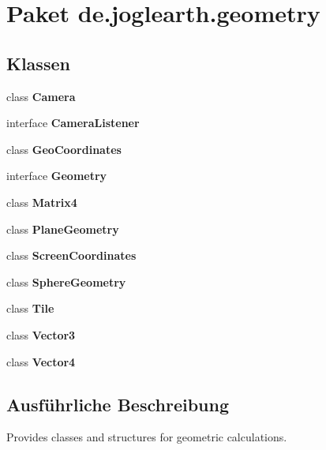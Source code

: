 \section{Paket de.\-joglearth.\-geometry}
\label{namespacede_1_1joglearth_1_1geometry}
\subsection*{Klassen}
\begin{DoxyCompactItemize}
\item 
class {\bf Camera}
\item 
interface {\bf Camera\-Listener}
\item 
class {\bf Geo\-Coordinates}
\item 
interface {\bf Geometry}
\item 
class {\bf Matrix4}
\item 
class {\bf Plane\-Geometry}
\item 
class {\bf Screen\-Coordinates}
\item 
class {\bf Sphere\-Geometry}
\item 
class {\bf Tile}
\item 
class {\bf Vector3}
\item 
class {\bf Vector4}
\end{DoxyCompactItemize}


\subsection{Ausführliche Beschreibung}
Provides classes and structures for geometric calculations. 